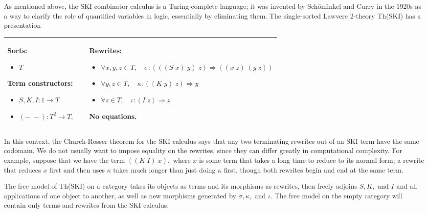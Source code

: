 \documentclass{llncs}
\newcommand{\maps}{\colon}
\renewcommand{\:}{\colon}
\begin{document}
As mentioned above, the SKI combinator calculus is a Turing-complete language; it was invented by Sch\"onfinkel \cite{Schonfinkel} and Curry \cite{Curry} in the 1920s as a way to clarify the role of quantified variables in logic, essentially by eliminating them.  The single-sorted Lawvere 2-theory Th(SKI) has a presentation
\begin{center}
  \begin{longtable}{|p{0.3\linewidth}|p{0.7\linewidth}|}
    \hline
    Sorts:
    \begin{itemize}
      \item $T$
    \end{itemize}
    Term constructors:
    \begin{itemize}
      \item $S, K, I\maps 1 \to T$
      \item $(-\;-)\maps T^2 \to T,$
    \end{itemize}
    &
    Rewrites:
    \begin{itemize}
      \item $\forall x,y,z \in T, \quad \sigma \maps (((S\; x)\; y)\; z) \Rightarrow ((x\; z)\; (y\; z))$
      \item $\forall y,z \in T, \quad \kappa \maps ((K\; y)\; z) \Rightarrow y$
      \item $\forall z \in T, \quad \iota \maps (I\; z) \Rightarrow z$
    \end{itemize}
    No equations.\\
    \hline
  \end{longtable}
\end{center}
In this context, the Church-Rosser theorem for the SKI calculus says that any two terminating rewrites out of an SKI term have the same codomain.  We do not usually want to impose equality on the rewrites, since they can differ greatly in computational complexity.  For example, suppose that we have the term $((K\; I)\; x),$ where $x$ is some term that takes a long time to reduce to its normal form; a rewrite that reduces $x$ first and then uses $\kappa$ takes much longer than just doing $\kappa$ first, though both rewrites begin and end at the same term.

The free model of Th(SKI) on a category takes its objects as terms and its morphisms as rewrites, then freely adjoins $S,K,$ and $I$ and all applications of one object to another, as well as new morphisms generated by $\sigma,\kappa,$ and $\iota.$  The free model on the empty category will contain only terms and rewrites from the SKI calculus.
\end{document}
